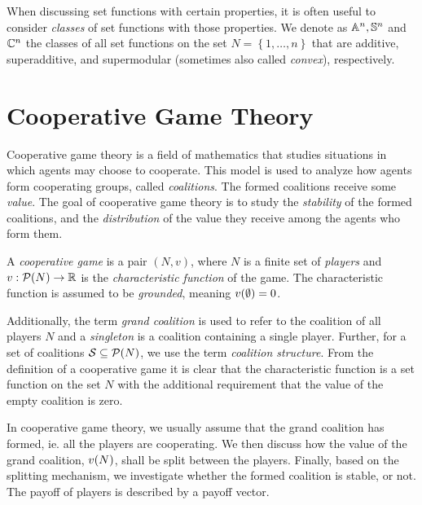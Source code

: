 When discussing set functions with certain properties, it is often useful to consider \emph{classes} of set functions with those properties.
We denote as $ \mathbb{A}^n, \mathbb{S}^n $ and $ \mathbb{C}^n $ the classes of all set functions on the set $ N = \left\{ 1, \ldots, n \right\} $ that are additive, superadditive, and supermodular (sometimes also called \emph{convex}), respectively.

\section{Cooperative Game Theory}

Cooperative game theory is a field of mathematics that studies situations in which agents may choose to cooperate.
This model is used to analyze how agents form cooperating groups, called \emph{coalitions}.
The formed coalitions receive some \emph{value}.
The goal of cooperative game theory is to study the \emph{stability} of the formed coalitions, and the \emph{distribution} of the value they receive among the agents who form them.

\begin{defi}
	A \emph{cooperative game} is a pair $ \left( N,v \right) $, where $ N $ is a finite set of \emph{players} and $ v: \mathcal{P}\!\left(N\right) \to \mathbb{R} $ is the \emph{characteristic function} of the game.
	The characteristic function is assumed to be \emph{grounded}, meaning $ v\!\left(\emptyset\right) = 0 $.
\end{defi}

Additionally, the term \emph{grand coalition} is used to refer to the coalition of all players $ N $ and a \emph{singleton} is a coalition containing a single player.
Further, for a set of coalitions $ \mathcal{S} \subseteq \mathcal{P}\!\left(N\right) $, we use the term \emph{coalition structure}.
From the definition of a cooperative game it is clear that the characteristic function is a set function on the set $ N $ with the additional requirement that the value of the empty coalition is zero.

In cooperative game theory, we usually assume that the grand coalition has formed, ie. all the players are cooperating.
We then discuss how the value of the grand coalition, $ v\!\left(N\right) $, shall be split between the players.
Finally, based on the splitting mechanism, we investigate whether the formed coalition is stable, or not.
The payoff of players is described by a payoff vector.

